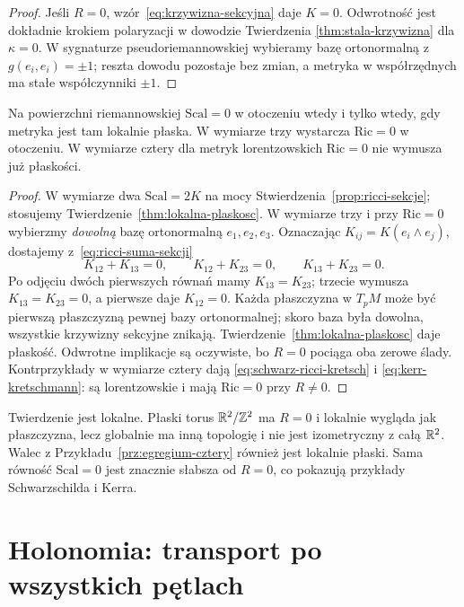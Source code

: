 \begin{proof}
Jeśli $R=0$, wzór~\eqref{eq:krzywizna-sekcyjna}
daje $K=0$. Odwrotność jest dokładnie krokiem
polaryzacji w dowodzie Twierdzenia
\ref{thm:stala-krzywizna} dla $\kappa=0$.
W sygnaturze pseudoriemannowskiej wybieramy
bazę ortonormalną z $g(e_i,e_i)=\pm1$; reszta
dowodu pozostaje bez zmian, a metryka w
współrzędnych ma stałe współczynniki $\pm1$.
\end{proof}

\begin{wniosek}
\label{cor:ricci-plaskosc-3d}
Na powierzchni riemannowskiej $\mathrm{Scal}=0$
w otoczeniu wtedy i tylko wtedy, gdy metryka jest
tam lokalnie płaska. W wymiarze trzy wystarcza
$\mathrm{Ric}=0$ w otoczeniu. W wymiarze cztery
dla metryk lorentzowskich $\mathrm{Ric}=0$
nie wymusza już płaskości.
\end{wniosek}
\begin{proof}
W wymiarze dwa $\mathrm{Scal}=2K$ na mocy
Stwierdzenia~\ref{prop:ricci-sekcje}; stosujemy
Twierdzenie~\ref{thm:lokalna-plaskosc}.
W wymiarze trzy i przy $\mathrm{Ric}=0$ wybierzmy
\emph{dowolną} bazę ortonormalną $e_1,e_2,e_3$.
Oznaczając $K_{ij}=K(e_i\wedge e_j)$, dostajemy
z~\eqref{eq:ricci-suma-sekcji}
\[
 K_{12}+K_{13}=0,\qquad
 K_{12}+K_{23}=0,\qquad
 K_{13}+K_{23}=0.
\]
Po odjęciu dwóch pierwszych równań mamy
$K_{13}=K_{23}$; trzecie wymusza
$K_{13}=K_{23}=0$, a pierwsze daje $K_{12}=0$.
Każda płaszczyzna w $T_pM$ może być pierwszą
płaszczyzną pewnej bazy ortonormalnej; skoro
baza była dowolna, wszystkie krzywizny sekcyjne
znikają. Twierdzenie~\ref{thm:lokalna-plaskosc}
daje płaskość. Odwrotne implikacje są oczywiste,
bo $R=0$ pociąga oba zerowe ślady.
Kontrprzykłady w wymiarze cztery dają
\eqref{eq:schwarz-ricci-kretsch} i
\eqref{eq:kerr-kretschmann}: są lorentzowskie
i mają $\mathrm{Ric}=0$ przy $R\ne0$.
\end{proof}

\begin{uwaga}
Twierdzenie jest lokalne. Płaski torus
$\mathbb{R}^2/\mathbb Z^2$ ma $R=0$ i lokalnie wygląda
jak płaszczyzna, lecz globalnie ma inną topologię
i nie jest izometryczny z całą $\mathbb{R}^2$.
Walec z Przykładu~\ref{prz:egregium-cztery}
również jest lokalnie płaski. Sama równość
$\mathrm{Scal}=0$ jest znacznie słabsza od
$R=0$, co pokazują przykłady Schwarzschilda
i Kerra.
\end{uwaga}

\section{Holonomia: transport po wszystkich pętlach}
\label{sec:holonomia}

